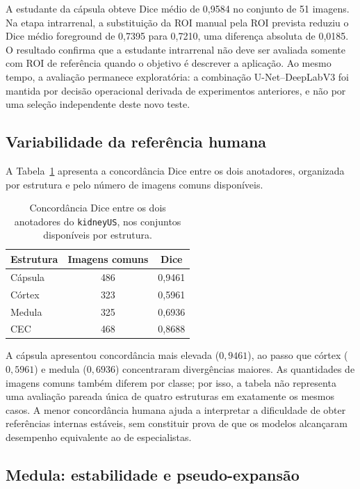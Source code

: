\documentclass[12pt]{article}
\begin{document}
A estudante da cápsula obteve Dice médio de 0,9584 no conjunto de 51 imagens.
Na etapa intrarrenal, a substituição da ROI manual pela ROI prevista reduziu o
Dice médio foreground de 0,7395 para 0,7210, uma diferença absoluta de 0,0185.
O resultado confirma que a estudante intrarrenal não deve ser avaliada somente
com ROI de referência quando o objetivo é descrever a aplicação. Ao mesmo
tempo, a avaliação permanece exploratória: a combinação U-Net--DeepLabV3 foi
mantida por decisão operacional derivada de experimentos anteriores, e não por
uma seleção independente deste novo teste.


\subsection{Variabilidade da referência humana}

A Tabela~\ref{tab:interobserver} apresenta a concordância Dice entre os dois anotadores, organizada por estrutura e pelo número de imagens comuns disponíveis.

\begin{table}[!htbp]
\centering
\caption[Concordância Dice entre anotadores humanos]{Concordância Dice entre os dois anotadores do \texttt{kidneyUS}, nos conjuntos disponíveis por estrutura.}
\label{tab:interobserver}
\begin{tabular}{lcc}
\toprule
\textbf{Estrutura} & \textbf{Imagens comuns} & \textbf{Dice} \\
\midrule
Cápsula & 486 & 0,9461 \\
Córtex & 323 & 0,5961 \\
Medula & 325 & 0,6936 \\
CEC & 468 & 0,8688 \\
\bottomrule
\end{tabular}
\end{table}

A cápsula apresentou concordância mais elevada ($0{,}9461$), ao passo que córtex ($0{,}5961$) e medula ($0{,}6936$) concentraram divergências maiores. As quantidades de imagens comuns também diferem por classe; por isso, a tabela não representa uma avaliação pareada única de quatro estruturas em exatamente os mesmos casos. A menor concordância humana ajuda a interpretar a dificuldade de obter referências internas estáveis, sem constituir prova de que os modelos alcançaram desempenho equivalente ao de especialistas.


\subsection{Medula: estabilidade e pseudo-expansão}
\end{document}
